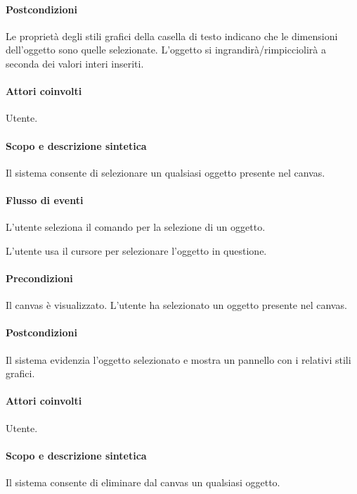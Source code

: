 \paragraph{Postcondizioni} Le propriet\` a degli stili grafici della casella di testo indicano che le dimensioni dell'oggetto  sono quelle selezionate. L'oggetto si ingrandir\`a/rimpicciolir\`a  a seconda dei valori interi inseriti.
                   
\paragraph{Attori coinvolti} Utente.
\paragraph{Scopo e descrizione sintetica} Il sistema consente di selezionare un qualsiasi oggetto presente nel canvas.
\paragraph{Flusso di eventi}
\begin{elenconumerato}[\textbf{}]{\subsubsecindent}
\item  L'utente seleziona il comando per la selezione di un oggetto.
\item  L'utente usa il cursore per selezionare l'oggetto in questione.
\end{elenconumerato}
\paragraph{Precondizioni} Il canvas \`e visualizzato. L'utente ha selezionato un oggetto presente nel canvas.
\paragraph{Postcondizioni} Il sistema evidenzia l'oggetto selezionato e mostra un pannello con i relativi stili grafici.

\paragraph{Attori coinvolti} Utente.
\paragraph{Scopo e descrizione sintetica} Il sistema consente di eliminare dal canvas un qualsiasi oggetto.
